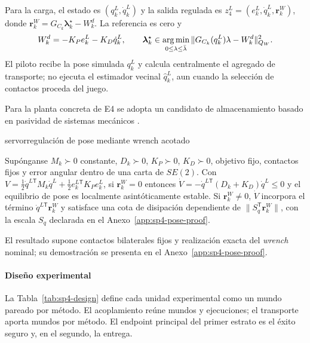 Para la carga, el estado es $(q_k^L,\dot q_k^L)$ y la salida regulada es
$z_4^L=(e_k^L,\dot q_k^L,\boldsymbol r_k^W)$, donde
$\boldsymbol r_k^W=G_{C_k}\boldsymbol\lambda_k^\star-W_k^d$. La referencia es cero y
\begin{equation}
\label{eq:sp4-pose-law}
W_k^d=-K_Pe_k^L-K_D\dot q_k^L,\qquad
\boldsymbol\lambda_k^\star\in\operatorname*{arg\,min}_{0\leq\lambda\leq\bar\lambda}
\|G_{C_k}(q_k^L)\lambda-W_k^d\|_{Q_W}^2.
\end{equation}
El piloto recibe la pose simulada $q_k^L$ y calcula centralmente el agregado de transporte; no ejecuta el estimador vecinal $\hat q_k^L$, aun cuando la selección de contactos proceda del juego.

Para la planta concreta de E4 se adopta un candidato de almacenamiento basado en pasividad de sistemas mecánicos \parencite{vanderschaf2017passivity,ortega2002passivity}.

\begin{contribucion}{servorregulación de pose mediante wrench acotado}
\begin{teorema}
\label{prop:sp4-pose-stability}
Supónganse $M_k\succ0$ constante, $D_k\succ0$, $K_P\succ0$, $K_D\succ0$, objetivo fijo, contactos fijos y error angular dentro de una carta de $SE(2)$. Con
$V=\tfrac12\dot q^{L\mathsf T}M_k\dot q^L+\tfrac12e_k^{L\mathsf T}K_Pe_k^L$, si $\boldsymbol r_k^W=0$ entonces
$\dot V=-\dot q^{L\mathsf T}(D_k+K_D)\dot q^L\leq0$ y el equilibrio de pose es localmente asintóticamente estable. Si $\boldsymbol r_k^W\neq0$, $\dot V$ incorpora el término $\dot q^{L\mathsf T}\boldsymbol r_k^W$ y satisface una cota de disipación dependiente de $\|S_q^{\mathsf T}\boldsymbol r_k^W\|$, con la escala $S_q$ declarada en el Anexo~\ref{app:sp4-pose-proof}.
\end{teorema}
El resultado supone contactos bilaterales fijos y realización exacta del \emph{wrench} nominal; su demostración se presenta en el Anexo~\ref{app:sp4-pose-proof}.
\end{contribucion}

\paragraph{Diseño experimental}

La Tabla~\ref{tab:sp4-design} define cada unidad experimental como un mundo pareado por método. El acoplamiento reúne \SPFourDockWorlds{} mundos y \SPFourDockRuns{} ejecuciones; el transporte aporta \SPFourTransportWorlds{} mundos por método. El endpoint principal del primer estrato es el éxito seguro y, en el segundo, la entrega.

